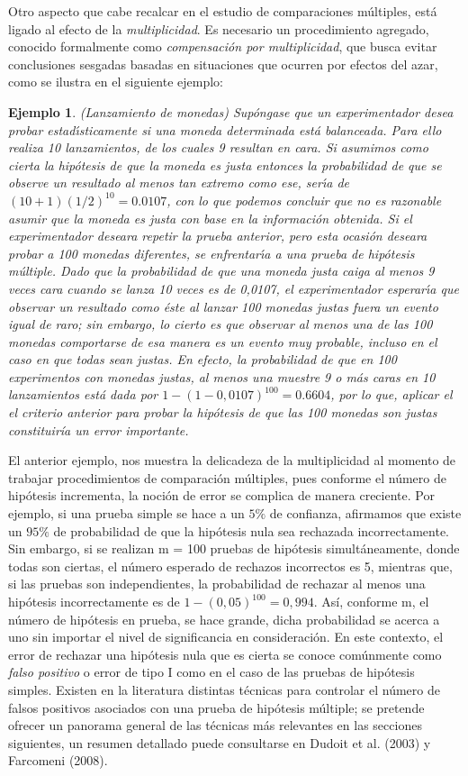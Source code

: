 \documentclass[11pt,letterpaper]{article}
\newtheorem{ej}{Ejemplo}[section]
\begin{document}
Otro aspecto que cabe recalcar en el estudio de comparaciones múltiples, está ligado al efecto de la \textit{multiplicidad}. Es necesario un procedimiento agregado, conocido formalmente como \textit{compensación por multiplicidad},
que busca evitar conclusiones sesgadas basadas en situaciones que ocurren por efectos del azar, como se
ilustra en el siguiente ejemplo:
\begin{ej}(Lanzamiento de monedas)
	\label{monedas}
		Supóngase que un experimentador desea probar estadı́sticamente si una moneda determinada está balanceada.
		Para ello realiza 10 lanzamientos, de los cuales 9 resultan en cara. Si asumimos como cierta la hipótesis
		de que la moneda es justa entonces la probabilidad de que se observe un resultado al menos tan extremo
		como ese, serı́a de $(10 + 1)(1/2)^{10} = 0.0107$, con lo que podemos concluir que no es razonable asumir que
		la moneda es justa con base en la información obtenida. Si el experimentador deseara repetir la prueba anterior, pero esta ocasión deseara probar a 100
		monedas diferentes, se enfrentarı́a a una prueba de hipótesis múltiple. Dado que la probabilidad de que
		una moneda justa caiga al menos 9 veces cara cuando se lanza 10 veces es de 0,0107, el experimentador
		esperarı́a que observar un resultado como éste al lanzar 100 monedas justas fuera un evento igual de
		raro; sin embargo, lo cierto es que observar al menos una de las 100 monedas comportarse de esa manera
		es un evento muy probable, incluso en el caso en que todas sean justas. En efecto, la probabilidad de
		que en 100 experimentos con monedas justas, al menos una muestre 9 o más caras en 10 lanzamientos
está dada por	
		$1 - (1 - 0,0107)^{100}= 0.6604$, por lo que, aplicar el el criterio anterior para probar la hipótesis de que
		las 100 monedas son justas constituiría un error importante.
\end{ej}
El anterior ejemplo, nos muestra la delicadeza de la multiplicidad al momento de trabajar procedimientos de comparación múltiples, pues conforme el número de hipótesis
incrementa, la noción de error se complica de manera creciente. Por ejemplo, si una prueba simple se
hace a un $5\%$ de confianza, afirmamos que existe un $95\%$ de probabilidad de que la hipótesis nula sea
rechazada incorrectamente. Sin embargo, si se realizan m = 100 pruebas de hipótesis simultáneamente,
donde todas son ciertas, el número esperado de rechazos incorrectos es 5, mientras que, si las pruebas son
independientes, la probabilidad de rechazar al menos una hipótesis incorrectamente es de $1 - (0,05)^{100} =
0,994$. Así, conforme m, el número de hipótesis en prueba, se hace grande, dicha
probabilidad se acerca a uno sin importar el nivel de significancia en consideración. En este contexto,
el error de rechazar una hipótesis nula que es cierta se conoce comúnmente como \textit{falso positivo} o error
de tipo I como en el caso de las pruebas de hipótesis simples. Existen en la literatura distintas técnicas
para controlar el número de falsos positivos asociados con una prueba de hipótesis múltiple; se pretende
ofrecer un panorama general de las técnicas más relevantes en las secciones siguientes, un resumen
detallado puede consultarse en Dudoit et al. (2003) y Farcomeni (2008).
\end{document}
